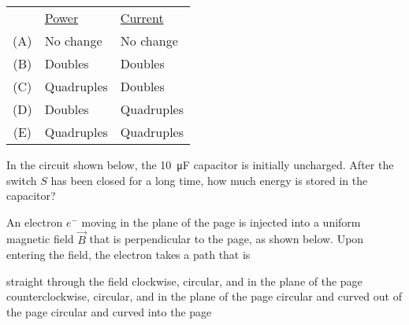 \documentclass[12pt]{../oss-classkick-exam}
\begin{document}
\begin{questions}
  \begin{tabular}{cll}
    & \underline{Power} & \underline{Current}\\
    (A) & No change  & No change \\
    (B) & Doubles    & Doubles   \\
    (C) & Quadruples & Doubles   \\
    (D) & Doubles    & Quadruples\\
    (E) & Quadruples & Quadruples
  \end{tabular}
  \newpage
  
  \question In the circuit shown below, the \SI{10}{\micro\farad} capacitor is
  initially uncharged. After the switch $S$ has been closed for a long time,
  how much energy is stored in the capacitor?

  \begin{minipage}{.4\linewidth}
  \end{minipage}
  \begin{minipage}{.54\linewidth}
  \end{minipage}
  \uplevel{\rule{\linewidth}{.5pt}}
  
  \question An electron $e^-$ moving in the plane of the page is injected into a
  uniform magnetic field $\vec B$ that is perpendicular to the page, as shown
  below. Upon entering the field, the electron takes a path that is

  \vspace{.1in}
  \begin{minipage}{.4\linewidth}
  \end{minipage}
  \begin{minipage}{.55\linewidth}
    \begin{choices}
      \choice straight through the field
      \choice clockwise, circular, and in the plane of the page
      \choice counterclockwise, circular, and in the plane of the page
      \choice circular and curved out of the page
      \choice circular and curved into the page
    \end{choices}
  \end{minipage}
  \vspace{.6in}
  

\end{questions}
\end{document}
